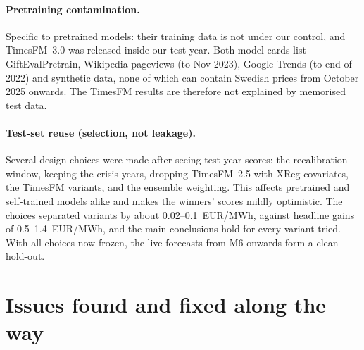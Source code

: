 \documentclass[11pt,a4paper]{article}
\begin{document}
\paragraph{Pretraining contamination.} Specific to pretrained models: their training data is
not under our control, and TimesFM~3.0 was released inside our test year. Both model cards list
GiftEvalPretrain, Wikipedia pageviews (to Nov 2023), Google Trends (to end of 2022) and
synthetic data, none of which can contain Swedish prices from October 2025 onwards. The
TimesFM results are therefore not explained by memorised test data.

\paragraph{Test-set reuse (selection, not leakage).} Several design choices were made after
seeing test-year scores: the recalibration window, keeping the crisis years, dropping TimesFM~2.5
with XReg covariates, the TimesFM variants, and the ensemble weighting. This affects pretrained
and self-trained models alike and makes the winners' scores mildly optimistic. The choices
separated variants by about 0.02--0.1~EUR/MWh, against headline gains of 0.5--1.4~EUR/MWh, and
the main conclusions hold for every variant tried. With all choices now frozen, the live
forecasts from M6 onwards form a clean hold-out.

\section{Issues found and fixed along the way}
\end{document}
